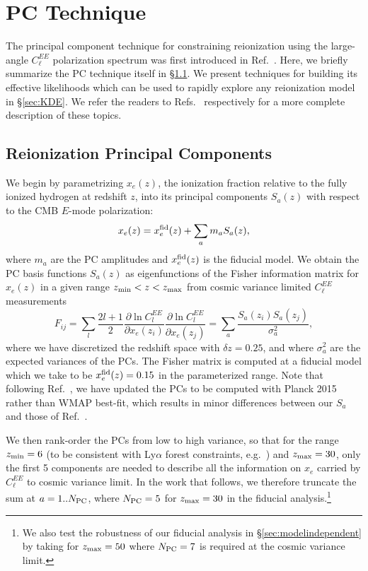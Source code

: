 \documentclass[prd,twocolumn,amsmath,amssymb,floatfix,superscriptaddress,nofootinbib]{revtex4-1}
\newcommand{\xef}{x_e^{\rm fid}}
\newcommand{\beq}{\begin{equation}}
\newcommand{\eeq}{\end{equation}}
\begin{document}
%
%
%
%
%

\section{PC Technique}
\label{sec:background}
The principal component technique for constraining reionization using the large-angle $C_\ell^{EE}$ polarization spectrum was first introduced in Ref.~\cite{Hu:2003gh}. Here, we  briefly summarize the PC technique itself in \S\ref{sec:PC}. We present  techniques for building its effective likelihoods which can be used to rapidly explore any reionization model in \S\ref{sec:KDE}. We refer the readers to Refs.~\cite{Mortonson:2007hq,Heinrich:2016ojb} respectively for a more complete description of these topics.

%
%
 
\subsection{Reionization Principal Components}
\label{sec:PC}
We begin by parametrizing $x_e(z)$, the ionization fraction relative to the fully ionized hydrogen at redshift $z$, into its principal components $S_{a}(z)$ with respect to the CMB $E$-mode polarization:
%
\begin{equation}
x_e(z)=\xef(z)+\sum_{a}m_{a}S_{a}(z),
\label{eq:mmutoxe}
\end{equation}
%
where $m_a$ are the PC amplitudes and $\xef(z)$ is the fiducial model. We obtain the PC basis functions $S_{a}(z)$ as eigenfunctions of the Fisher information matrix for $x_e(z)$ in a given range $z_{\rm min}<z<z_{\rm max}$ from cosmic variance limited $C_\ell^{EE}$ measurements 
%
\beq
F_{ij} = \sum_l \frac{2 l+1}{2} \frac{\partial \ln C_l^{EE}}{\partial x_e(z_i)}\frac{\partial \ln C_l^{EE}}{\partial x_e(z_j)} = \sum_a \frac{ S_a(z_i) S_a(z_j)}{\sigma_a^2},
\eeq
%
where we have discretized the redshift space with $\delta z= 0.25$, and where $\sigma_a^2$ are the expected variances of the PCs.
The Fisher matrix is computed at a fiducial model which we take to be $x_e^{\rm fid}(z)=0.15$ in the parameterized range.
 Note that following Ref.~\cite{Heinrich:2018btc}, we have updated the PCs to be computed 
 with Planck 2015 rather than WMAP best-fit,
 which results in minor differences between our $S_a$ and those of  Ref.~\cite{Heinrich:2016ojb}. 


We then rank-order the PCs from low to high variance, so that for the range $z_{\rm min} = 6$ (to be consistent with Ly$\alpha$ forest constraints, e.g.~\cite{Becker:2015lua}) and $z_{\rm max} = 30$, only the first 5 components are needed to describe all the information on $x_e$ carried by $C_\ell^{EE}$ to cosmic variance limit. In the work that follows, we therefore truncate the sum at $a = 1 .. N_{\rm{PC}}$, where $N_{\rm{PC}} = 5$ for $z_{\rm max} = 30$ in the fiducial analysis.\footnote{We also test the robustness of our fiducial analysis in \S \ref{sec:modelindependent} by taking 
 for $z_{\rm max} = 50$ where $N_{\rm{PC}} = 7$ is required at the cosmic variance limit.}   
 
\end{document}
